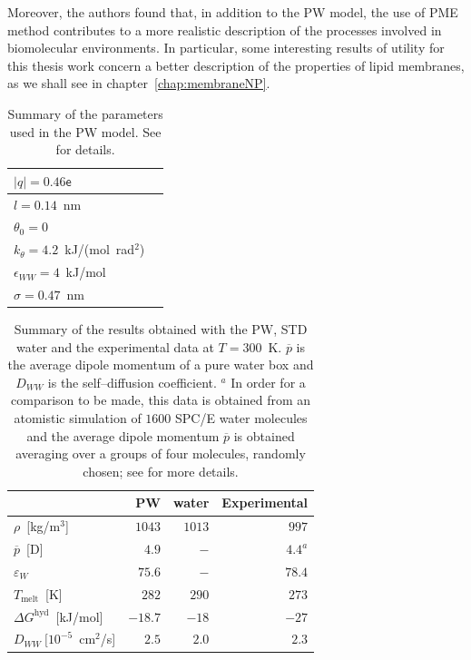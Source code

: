 Moreover, the authors found that, in addition to the \ac{PW} model, the use of \ac{PME} method contributes to a
more realistic description of the processes involved in biomolecular environments. In particular, some
interesting results of utility for this thesis work concern a better description of the properties of lipid
membranes, as we shall see in chapter~\ref{chap:membraneNP}.

\begin{table}
	\centering
	\begin{tabular}{ll}
		\toprule
		$|q| = 0.46\mathsf{e}$				\\ \midrule
		$l = 0.14$~nm						\\ \midrule
		$\theta_0 = 0$						\\ \midrule
		$k_\theta = 4.2$~kJ/(mol\ rad$^2$)	\\ \midrule
		$\epsilon_{WW} = 4$~kJ/mol			\\ \midrule
		$\sigma = 0.47$~nm					\\ \bottomrule
	\end{tabular}
	\caption{Summary of the parameters used in the \acs{PW} model. See \cite{PW} for details.}
	\label{tab:PWParam}
\end{table}

\begin{table}
	\centering
	\begin{tabular}{lrrr}
		\toprule
		\,	& \acs{PW} &  \martini water & Experimental \\ \toprule
		$\rho$~[kg/m$^3$]				& $1043$  & $1013$  & $997$		\\ \midrule
		$\overline{p}$~[D] 				& $4.9$   & $-$ 	& $4.4^a$		\\ \midrule
		$\varepsilon_{W}$ 				& $75.6$  & $-$ 	& $78.4$	\\ \midrule
		$T_\text{melt}$~[K] 			& $282$   & $290$ 	& $273$		\\ \midrule
		$\Delta G^\text{hyd}$~[kJ/mol] 	& $-18.7$ &	$-18$	& $-27$		\\ \midrule%
		$D_{WW}~[10^{-5}$~cm$^2$/s]		& $2.5$   & $2.0$   & $2.3$		\\ \bottomrule
	\end{tabular}
	\caption{Summary of the results obtained with the \acs{PW}, \acs{STD} \martini water and the experimental data at $T=300$~K. $\overline{p}$ is the average dipole momentum of a pure water box and $D_{WW}$ is the self--diffusion coefficient. $^a$ In order for a comparison to be made, this data is obtained from an atomistic simulation of $1600$ SPC/E water molecules and the average dipole momentum $\overline{p}$ is obtained averaging over a groups of four molecules, randomly chosen; see \cite{PW} for more details.}
	\label{tab:PWRes}
\end{table}

